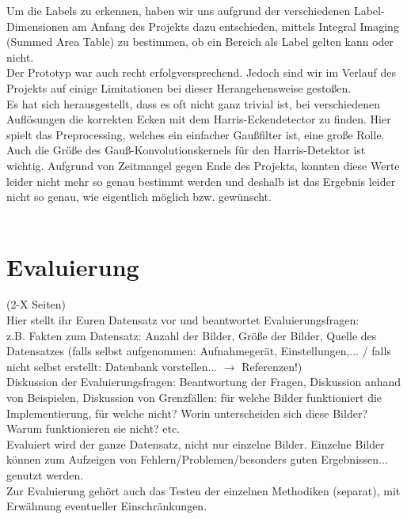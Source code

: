 \documentclass[paper=A4, deutsch]{scrartcl}
\begin{document}
Um die Labels zu erkennen, haben wir uns aufgrund der verschiedenen Label-Dimensionen am Anfang des Projekts dazu entschieden, mittels Integral Imaging (Summed Area Table) zu bestimmen, ob ein Bereich als Label gelten kann oder nicht.\\
Der Prototyp war auch recht erfolgversprechend. Jedoch sind wir im Verlauf des Projekts auf einige Limitationen bei dieser Herangehensweise gestoßen.\\
Es hat sich herausgestellt, dass es oft nicht ganz trivial ist, bei verschiedenen Auflösungen die korrekten Ecken mit dem Harris-Eckendetector zu finden. Hier spielt das Preprocessing, welches ein einfacher Gaußfilter ist, eine große Rolle. Auch die Größe des Gauß-Konvolutionskernels für den Harris-Detektor ist wichtig. Aufgrund von Zeitmangel gegen Ende des Projekts, konnten diese Werte leider nicht mehr so genau bestimmt werden und deshalb ist das Ergebnis leider nicht so genau, wie eigentlich möglich bzw. gewünscht.\\
\\

\section{Evaluierung}
(2-X Seiten)\\
Hier stellt ihr Euren Datensatz vor und beantwortet Evaluierungsfragen:\\
z.B. Fakten zum Datensatz: Anzahl der Bilder, Größe der Bilder, Quelle des Datensatzes (falls selbst aufgenommen: Aufnahmegerät, Einstellungen,... / falls nicht selbst erstellt: Datenbank vorstellen... $\to$ Referenzen!)\\
Diskussion der Evaluierungsfragen: Beantwortung der Fragen, Diskussion anhand von Beispielen, Diskussion von Grenzfällen: für welche Bilder funktioniert die Implementierung, für welche nicht? Worin unterscheiden sich diese Bilder? Warum funktionieren sie nicht? etc.\\
Evaluiert wird der ganze Datensatz, nicht nur einzelne Bilder. Einzelne Bilder können zum Aufzeigen von Fehlern/Problemen/besonders guten Ergebnissen... genutzt werden.\\
Zur Evaluierung gehört auch das Testen der einzelnen Methodiken (separat), mit Erwähnung eventueller Einschränkungen.

\end{document}

